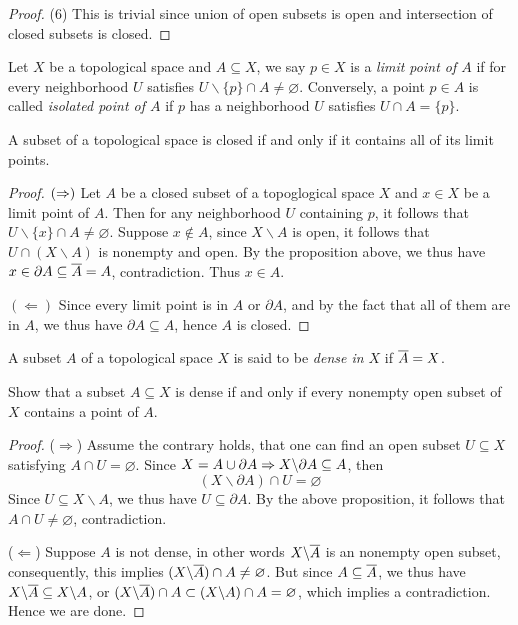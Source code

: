 \begin{proof}
    (6) This is trivial since union of open subsets is open and intersection of closed subsets is closed.
\end{proof}

\begin{definition}
    Let $X$ be a topological space and $A \subseteq X$, we say $p \in X$ is a \textit{limit point of $A$} if for every neighborhood $U$ satisfies $U\backslash \{p\} \cap A \neq \varnothing$. Conversely, a point $p \in A$ is called \textit{isolated point of $A$} if $p$ has a neighborhood $U$ satisfies $U \cap A = \{p\}$.
\end{definition}
\begin{proposition}
    A subset of a topological space is closed if and only if it contains all of its limit points.
\end{proposition}
\begin{proof}
    $(\Rightarrow)$ Let $A$ be a closed subset of a topoglogical space $X$ and $x \in X$ be a limit point of $A$. Then for any neighborhood $U$ containing $p$, it follows that $U \backslash \{x\} \cap A \neq \varnothing$. Suppose $x \notin A$, since $X \backslash A$ is open, it follows that $U \cap (X \backslash A)$ is nonempty and open. By the proposition above, we thus have $x \in \partial A \subseteq \overline{A} = A$, contradiction. Thus $x \in A$.

    $(\Leftarrow)$ Since every limit point is in $A$ or $\partial A$, and by the fact that all of them are in $A$, we thus have $\partial A \subseteq A$, hence $A$ is closed.
\end{proof}
\begin{definition}
    A subset $A$ of a topological space $X$ is said to be \textit{dense in $X$} if $\overline{A} = X$.
\end{definition}
\begin{proposition}
    Show that a subset $A \subseteq X$ is dense if and only if every nonempty open subset of $X$ contains a point of $A$.
\end{proposition}
\begin{proof}
    ($\Rightarrow$) Assume the contrary holds, that one can find an open subset $U \subseteq X$ satisfying $A \cap U = \varnothing$. Since $X = A \cup \partial A \Rightarrow X \backslash\partial A \subseteq A$, then 
    \[
        (X \backslash \partial A)\cap U = \varnothing
    \]
    Since $U \subseteq X \backslash A$, we thus have $U \subseteq \partial A$. By the above proposition, it follows that $A \cap U \neq \varnothing$, contradiction.

    ($\Leftarrow$) Suppose $A$ is not dense, in other words $X \backslash \overline{A}$ is an nonempty open subset, consequently, this implies $(X \backslash \overline{A})\cap A \neq \varnothing$. But since $A \subseteq \overline{A}$, we thus have $X \backslash \overline{A} \subseteq X \backslash A$, or $(X \backslash \overline{A}) \cap A \subset (X \backslash A)\cap A = \varnothing$, which implies a contradiction. Hence we are done.
\end{proof}
